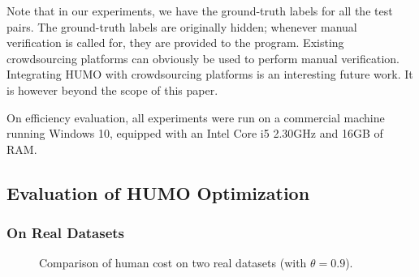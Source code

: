   Note that in our experiments, we have the ground-truth labels for all the test pairs. The ground-truth labels are originally hidden; whenever manual verification is called for, they are provided to the program. Existing crowdsourcing platforms can obviously be used to perform manual verification. Integrating HUMO with crowdsourcing platforms is an interesting future work. It is however beyond the scope of this paper.
	
  On efficiency evaluation, all experiments were run on a commercial machine running Windows 10, equipped with an Intel Core i5 2.30GHz and 16GB of RAM.
	
\subsection{Evaluation of HUMO Optimization} \label{sec:HUMO-experiment}

\subsubsection{On Real Datasets}

\begin{figure}
\setlength{\abovecaptionskip}{\figcaptionspace}
\centering
{}
\caption{Comparison of human cost on two real datasets (with $\theta =0.9$).}
\label{fig:realdata-evaluation}
\end{figure}

